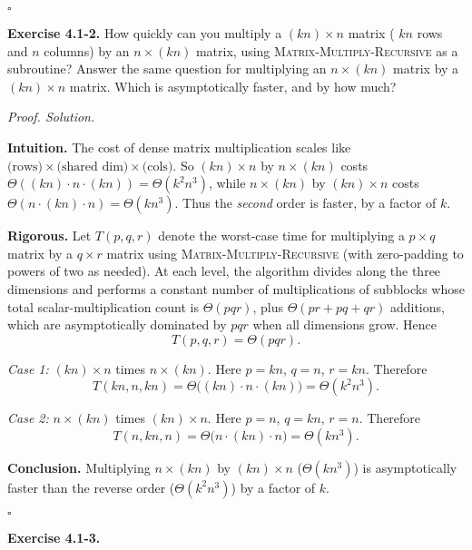 \documentclass[12pt]{article}
\theoremstyle{definition}
\begin{document}
\hfill$\square$

\newpage

\noindent\textbf{Exercise 4.1-2.}
How quickly can you multiply a $(k n)\times n$ matrix ( $k n$ rows and $n$ columns) by an
$n\times (k n)$ matrix, using \textsc{Matrix-Multiply-Recursive} as a subroutine?
Answer the same question for multiplying an $n\times (k n)$ matrix by a $(k n)\times n$ matrix.
Which is asymptotically faster, and by how much?

\medskip
\noindent\textit{Proof. Solution.}

\noindent\textbf{Intuition.}
The cost of dense matrix multiplication scales like \(\text{(rows)}\times\text{(shared dim)}\times\text{(cols)}\).
So
\((k n)\times n\) by \(n\times (k n)\) costs \(\Theta((kn)\cdot n \cdot (kn))=\Theta(k^{2}n^{3})\),
while
\(n\times (k n)\) by \((k n)\times n\) costs \(\Theta(n\cdot (kn)\cdot n)=\Theta(k n^{3})\).
Thus the \emph{second} order is faster, by a factor of \(k\).

\noindent\textbf{Rigorous.}
Let \(T(p,q,r)\) denote the worst-case time for multiplying a \(p\times q\) matrix by a \(q\times r\) matrix
using \textsc{Matrix-Multiply-Recursive} (with zero-padding to powers of two as needed).
At each level, the algorithm divides along the three dimensions and performs a constant number of
multiplications of subblocks whose total scalar-multiplication count is \(\Theta(pqr)\),
plus \(\Theta(pr+pq+qr)\) additions, which are asymptotically dominated by \(pqr\) when all
dimensions grow. Hence
\[
T(p,q,r)=\Theta(pqr).
\]

\smallskip
\emph{Case 1:} \((k n)\times n\) times \(n\times (k n)\).
Here \(p=kn\), \(q=n\), \(r=kn\). Therefore
\[
T(kn,n,kn)=\Theta\big((kn)\cdot n\cdot (kn)\big)=\Theta(k^{2}n^{3}).
\]

\emph{Case 2:} \(n\times (k n)\) times \((k n)\times n\).
Here \(p=n\), \(q=kn\), \(r=n\). Therefore
\[
T(n,kn,n)=\Theta\big(n\cdot (kn)\cdot n\big)=\Theta(k n^{3}).
\]

\noindent\textbf{Conclusion.}
Multiplying \(n\times (k n)\) by \((k n)\times n\) (\(\Theta(k n^{3})\)) is asymptotically faster than the reverse order
(\(\Theta(k^{2} n^{3})\)) by a factor of \(k\).

\hfill$\square$

\newpage

\noindent\textbf{Exercise 4.1-3.}
\end{document}
